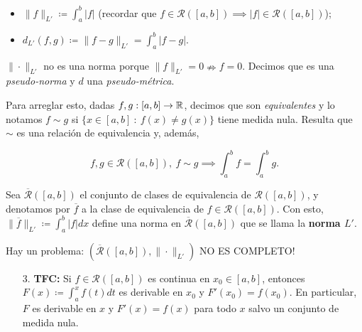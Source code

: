 	\begin{itemize}
		\item $\| f \|_{L'} \coloneq \int_{a}^{b} |f|$ (recordar que $f \in \mathcal{R}([a,b]) \implies |f| \in \mathcal{R}([a,b])$);

		\item $d_{L'} (f,g) \coloneq \| f - g \|_{L'} = \int_{a}^{b} |f-g|$.
	\end{itemize}

	\begin{remark}
		$\| \cdot \|_{L'}$ no es una norma porque $\| f \|_{L'} = 0 \nRightarrow f = 0$. Decimos que es una \textit{pseudo-norma} y $d$ una \textit{pseudo-métrica}.
	\end{remark}

	Para arreglar esto, dadas $f,g : [a,b] \to \mathbb{R}$, decimos que son \textit{equivalentes} y lo notamos $f \sim g$ si $\{ x \in [a,b] \ : \ f(x) \neq g(x) \}$ tiene medida nula. Resulta que $\sim$ es una relación de equivalencia y, además,

	\[
	f,g \in \mathcal{R} ([a,b]),\ f \sim g \implies \int_{a}^{b} f = \int_{a}^{b} g.
	\]

	Sea $\overline{\mathcal{R}}([a,b])$ el conjunto de clases de equivalencia de $\mathcal{R}([a,b])$, y denotamos por $\overline{f}$ a la clase de equivalencia de $f \in \mathcal{R}([a,b])$. Con esto, $\| \overline{f} \|_{L'} \coloneq \int_{a}^{b} |f| dx$ define una norma en $\overline{\mathcal{R}} ([a,b])$ que se llama la \textbf{norma $L'$}.

	\begin{remark}
		Hay un problema: $(\overline{\mathcal{R}} ([a,b]), \| \cdot \|_{L'})$ NO ES COMPLETO!
	\end{remark}

	\begin{enumerate}
		\item[3.] \textbf{TFC:} Si $f \in \mathcal{R} ([a,b])$ es continua en $x_0 \in [a,b]$, entonces $F(x) \coloneq \int_{a}^{x} f(t) dt$ es derivable en $x_0$ y $F'(x_0) = f(x_0)$. En particular, $F$ es derivable en $x$ y $F'(x)=f(x)$ para todo $x$ salvo un conjunto de medida nula.
	\end{enumerate}
